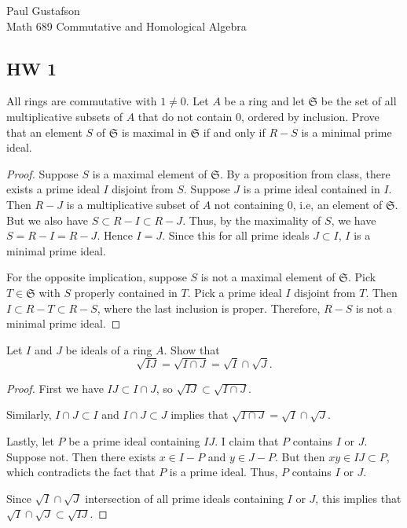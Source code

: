 \documentclass{article}
\begin{document}
\noindent Paul Gustafson\\
\noindent Math 689 Commutative and Homological Algebra

\subsection*{HW 1}
All rings are commutative with $1 \neq 0$.
 Let $A$ be a ring and let $\mathfrak S$ be the set of all multiplicative subsets of $A$ that do not contain $0$, ordered by inclusion.  Prove that an element $S$ of $\mathfrak S$ is maximal in $\mathfrak S$ if and only if $R - S$ is a minimal prime ideal.
\begin{proof}
Suppose $S$ is a maximal element of $\mathfrak S$. By a proposition from class, there exists a prime ideal $I$ disjoint from $S$.  Suppose $J$ is a prime ideal contained in $I$.  Then $R - J$ is a multiplicative subset of $A$ not containing $0$, i.e, an element of $\mathfrak S$.  But we also have $S \subset R - I \subset R -J$. Thus, by the maximality of $S$, we have $S = R - I = R - J$.  Hence $I = J$. Since this for all prime ideals $J \subset I$, $I$ is a minimal prime ideal.

For the opposite implication, suppose $S$ is not a maximal element of $\mathfrak S$. Pick $T \in \mathfrak S$ with $S$ properly contained in $T$.  Pick a prime ideal $I$ disjoint from $T$. Then
$I \subset R - T \subset R - S$, where the last inclusion is proper.  Therefore, $R - S$ is not a minimal prime ideal.
\end{proof}

 Let $I$ and $J$ be ideals of a ring $A$. Show that 
$$\sqrt{IJ} = \sqrt{ I \cap J }   = \sqrt I \cap \sqrt J .$$

\begin{proof}
First we have $IJ \subset I \cap J$, so $\sqrt{IJ} \subset \sqrt{ I \cap J}$.

Similarly, $I \cap J \subset I$ and $I \cap J \subset J$ implies that $\sqrt{ I \cap J }   = \sqrt I \cap \sqrt J$.


Lastly, let $P$ be a prime ideal containing $IJ$.  I claim that $P$ contains $I$ or $J$. Suppose not.  Then there exists $x \in I - P$ and $y \in J - P$.
But then $xy \in IJ \subset P$, which contradicts the fact that $P$ is a prime ideal. Thus, $P$ contains $I$ or $J$.

Since $\sqrt I \cap \sqrt J$ intersection of all prime ideals containing $I$ or $J$, this implies that $\sqrt I \cap \sqrt J \subset \sqrt{IJ}$.
\end{proof}
\end{document}
